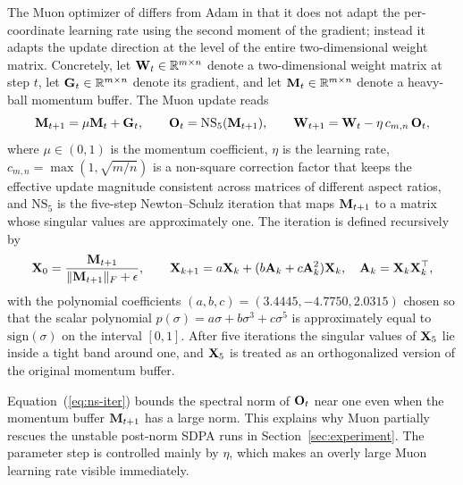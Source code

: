 The Muon optimizer of \citet{jordan2024muon} differs from Adam in that it does not adapt the per-coordinate learning rate using the second moment of the gradient; instead it adapts the update direction at the level of the entire two-dimensional weight matrix. Concretely, let $\mathbf{W}_t \in \mathbb{R}^{m \times n}$ denote a two-dimensional weight matrix at step $t$, let $\mathbf{G}_t \in \mathbb{R}^{m \times n}$ denote its gradient, and let $\mathbf{M}_t \in \mathbb{R}^{m \times n}$ denote a heavy-ball momentum buffer. The Muon update reads
\begin{equation}
\label{eq:muon-update}
\mathbf{M}_{t+1} = \mu \mathbf{M}_t + \mathbf{G}_t, \qquad \mathbf{O}_t = \text{NS}_5(\mathbf{M}_{t+1}), \qquad \mathbf{W}_{t+1} = \mathbf{W}_t - \eta \, c_{m,n} \, \mathbf{O}_t,
\end{equation}
where $\mu \in (0, 1)$ is the momentum coefficient, $\eta$ is the learning rate, $c_{m,n} = \max(1, \sqrt{m/n})$ is a non-square correction factor that keeps the effective update magnitude consistent across matrices of different aspect ratios, and $\text{NS}_5$ is the five-step Newton--Schulz iteration that maps $\mathbf{M}_{t+1}$ to a matrix whose singular values are approximately one. The iteration is defined recursively by
\begin{equation}
\label{eq:ns-iter}
\mathbf{X}_0 = \frac{\mathbf{M}_{t+1}}{\| \mathbf{M}_{t+1} \|_F + \epsilon}, \qquad \mathbf{X}_{k+1} = a \mathbf{X}_k + (b \mathbf{A}_k + c \mathbf{A}_k^2) \mathbf{X}_k, \quad \mathbf{A}_k = \mathbf{X}_k \mathbf{X}_k^\top,
\end{equation}
with the polynomial coefficients $(a, b, c) = (3.4445, -4.7750, 2.0315)$ chosen so that the scalar polynomial $p(\sigma) = a\sigma + b\sigma^3 + c\sigma^5$ is approximately equal to $\mathrm{sign}(\sigma)$ on the interval $[0, 1]$. After five iterations the singular values of $\mathbf{X}_5$ lie inside a tight band around one, and $\mathbf{X}_5$ is treated as an orthogonalized version of the original momentum buffer.

Equation~(\ref{eq:ns-iter}) bounds the spectral norm of $\mathbf{O}_t$ near one even when the momentum buffer $\mathbf{M}_{t+1}$ has a large norm. This explains why Muon partially rescues the unstable post-norm SDPA runs in Section~\ref{sec:experiment}. The parameter step is controlled mainly by $\eta$, which makes an overly large Muon learning rate visible immediately.
